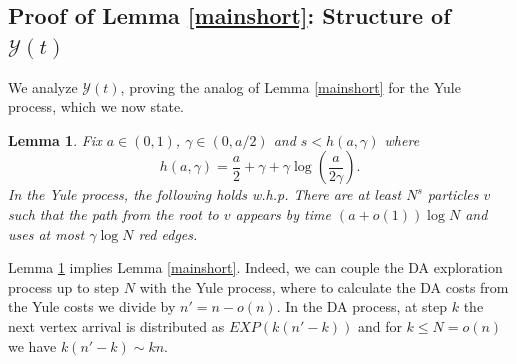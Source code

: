 \documentclass[12pt]{article}
\newcommand{\1}{\textbf{1}}
\newtheorem{lemma}[theorem]{Lemma}
\def\cY{{\mathcal Y}}
\begin{document}
\subsection{Proof of Lemma \ref{mainshort}: Structure of $\cY(t)$}\label{main1}

 We analyze $\cY(t)$, proving the analog of Lemma \ref{mainshort} for the Yule process, which we now state. 
\begin{lemma}\label{mainshort2}
Fix $a\in(0,1)$, $\gamma\in(0,a/2)$ and $s<h(a,\gamma)$ where
\[
h(a,\gamma)=\frac{a}{2}+\gamma+\gamma\log\!\left(\frac{a}{2\gamma}\right).
\]
In the Yule process, the following holds w.h.p. There are at least $N^s$ particles $v$ such that the path  from the root to $v$ appears by time $\left(a+o(1)\right)\log N$ and uses at most $\gamma\log N$ red edges.
\end{lemma}
Lemma \ref{mainshort2} implies  Lemma \ref{mainshort}. Indeed, we can couple the DA exploration process up to step $N$ with the Yule process, where to calculate the DA costs from the Yule costs we divide by $n'=n-o(n)$. In the DA process, at step $k$ the next vertex arrival is distributed as $EXP(k(n'-k))$ and for $k \le N = o(n)$ we have $k(n'-k) \sim kn$. 
\end{document}
